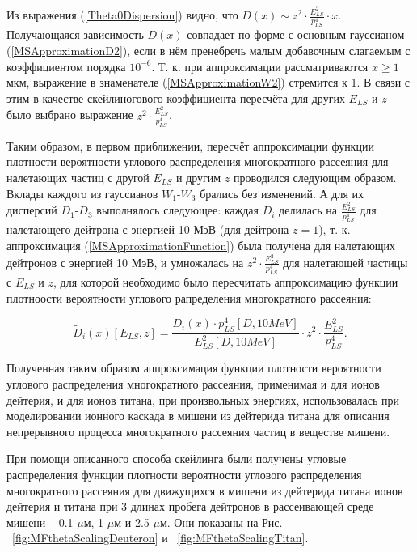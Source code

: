 \documentclass[a4paper,12pt]{article}
\begin{document}
\begin{large}
  	Из выражения (\ref{Theta0Dispersion}) видно, что $D(x) \sim z^2 \cdot \frac{E^2_{LS}}{p^4_{LS}} \cdot x$.
  	Получающаяся зависимость $D(x)$ совпадает по форме с основным гауссианом (\ref{MSApproximationD2}), если в нём пренебречь малым добавочным слагаемым с коэффициентом порядка $10^{-6}$.
  	Т. к. при аппроксимации рассматриваются $x \geq 1$ мкм, выражение в знаменателе (\ref{MSApproximationW2}) стремится к 1.
  	В связи с этим в качестве скейлиногового коэффициента пересчёта для других $E_{LS}$ и $z$ было выбрано выражение $z^2 \cdot \frac{E^2_{LS}}{p^4_{LS}}$.
  
  	Таким образом, в первом приближении, пересчёт аппроксимации функции плотности вероятности углового распределения многократного рассеяния для налетающих частиц с другой $E_{LS}$ и другим $z$ проводился следующим образом.
  	Вклады каждого из гауссианов $W_1$-$W_3$ брались без изменений.
  	А для их дисперсий $D_1$-$D_3$ выполнялось следующее: каждая $D_i$ делилась на $\frac{E^2_{LS}}{p^4_{LS}}$ для налетающего дейтрона с энергией 10 МэВ (для дейтрона $z=1$), т. к. аппроксимация (\ref{MSApproximationFunction}) была получена для налетающих дейтронов с энергией 10 МэВ, и умножалась на $z^2 \cdot \frac{E^2_{LS}}{p^4_{LS}}$ для налетающей частицы с $E_{LS}$ и $z$, для которой необходимо было пересчитать аппроксимацию функции плотноости вероятности углового рапределения многократного рассеяния:
  	
\begin{equation}
  \label{DispersionScaling}
   \tilde D_i(x)[E_{LS}, z]=\frac{D_i(x) \cdot p^{4}_{LS}[D, 10 MeV]}{E^{2}_{LS}[D, 10 MeV]} \cdot z^2 \cdot \frac{E^{2}_{LS}}{p^{4}_{LS}}.
\end{equation}  

	Полученная таким образом аппроксимация функции плотности вероятности углового распределения многократного рассеяния, применимая и для ионов дейтерия, и для ионов титана, при произвольных энергиях, использовалась при моделировании ионного каскада в мишени из дейтерида титана для описания непрерывного процесса многократного рассеяния частиц в веществе мишени.

	При помощи описанного способа скейлинга были получены угловые распределения функции плотности вероятности углового распределения многократного рассеяния для движущихся в мишени из дейтерида титана ионов дейтерия и титана при 3 длинах пробега дейтронов в рассеивающей среде мишени -- 0.1 $\mu$м, 1 $\mu$м и 2.5 $\mu$м.
	Они показаны на Рис. ~\ref{fig:MFthetaScalingDeuteron} и ~\ref{fig:MFthetaScalingTitan}.
	

\end{large}
\end{document}
